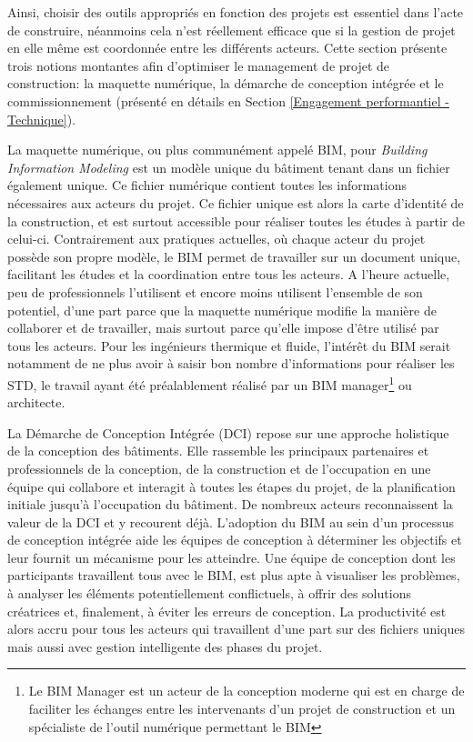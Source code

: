 Ainsi, choisir des outils appropriés en fonction des projets est essentiel dans l'acte de construire, néanmoins cela n'est réellement efficace que si la gestion de projet en elle même est coordonnée entre les différents acteurs. Cette section présente trois notions montantes afin d'optimiser le management de projet de construction: la maquette numérique, la démarche de conception intégrée et le commissionnement (présenté en détails en Section \ref{Engagement performantiel - Technique}).

La maquette numérique, ou plus communément appelé BIM, pour \textit{Building Information Modeling} est un modèle unique du bâtiment tenant dans un fichier également unique. Ce fichier numérique contient toutes les informations nécessaires aux acteurs du projet. Ce fichier unique est alors la carte d'identité de la construction, et est surtout accessible pour réaliser toutes les études à partir de celui-ci. Contrairement aux pratiques actuelles, où chaque acteur du projet possède son propre modèle, le BIM permet de travailler sur un document unique, facilitant les études et la coordination entre tous les acteurs. A l'heure actuelle, peu de professionnels l'utilisent et encore moins utilisent l'ensemble de son potentiel, d'une part parce que la maquette numérique modifie la manière de collaborer et de travailler, mais surtout parce qu'elle impose d'être utilisé par tous les acteurs. Pour les ingénieurs thermique et fluide, l'intérêt du BIM serait notamment de ne plus avoir à saisir bon nombre d'informations pour réaliser les STD, le travail ayant été préalablement réalisé par un BIM manager\footnote{Le BIM Manager est un acteur de la conception moderne qui est en charge de faciliter les échanges entre les intervenants d'un projet de construction et un spécialiste de l'outil numérique permettant le BIM} ou architecte. 

La Démarche de Conception Intégrée (DCI) repose sur une approche holistique de la conception des bâtiments. Elle rassemble les principaux partenaires et professionnels de la conception, de la construction et de l'occupation en une équipe qui collabore et interagit à toutes les étapes du projet, de la planification initiale jusqu'à l'occupation du bâtiment. De nombreux acteurs reconnaissent la valeur de la DCI et y recourent déjà. L'adoption du BIM au sein d'un processus de conception intégrée aide les équipes de conception à déterminer les objectifs et leur fournit un mécanisme pour les atteindre. Une équipe de conception dont les participants travaillent tous avec le BIM, est plus apte à visualiser les problèmes, à analyser les éléments potentiellement conflictuels, à offrir des solutions créatrices et, finalement, à éviter les erreurs de conception. La productivité est alors accru pour tous les acteurs qui travaillent d'une part sur des fichiers uniques mais aussi avec gestion intelligente des phases du projet.

